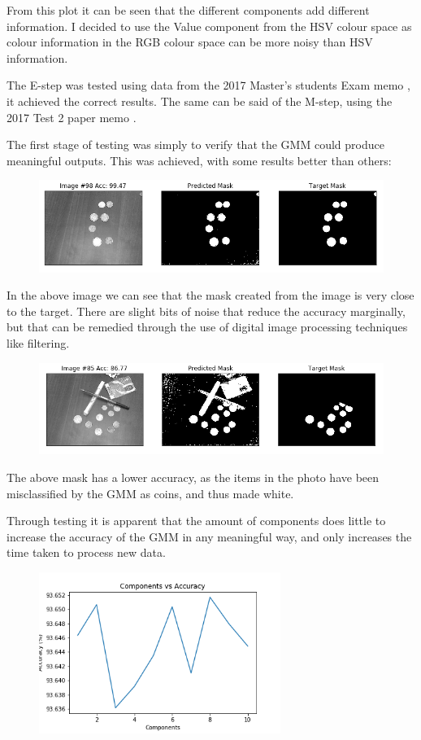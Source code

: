 \documentclass[10pt]{article}
\begin{document}
From this plot it can be seen that the different components add different information. I decided to use the Value component from the HSV colour space as colour information in the RGB colour space can be more noisy than HSV information. 

The E-step was tested using data from the 2017 Master's students Exam memo \cite{exam}, it achieved the correct results. The same can be said of the M-step, using the 2017 Test 2 paper memo \cite{test}.

The first stage of testing was simply to verify that the GMM could produce meaningful outputs. This was achieved, with some results better than others:
\begin{figure}[H]
    \includegraphics[width=\textwidth]{98}
    \centering
\end{figure}

In the above image we can see that the mask created from the image is very close to the target. There are slight bits of noise that reduce the accuracy marginally, but that can be remedied through the use of digital image processing techniques like filtering.

\begin{figure}[H]
    \includegraphics[width=\textwidth]{85}
    \centering
\end{figure}

The above mask has a lower accuracy, as the items in the photo have been misclassified by the GMM as coins, and thus made white.

Through testing it is apparent that the amount of components does little to increase the accuracy of the GMM in any meaningful way, and only increases the time taken to process new data. 

\begin{figure}[H]
    \includegraphics[width=0.7\textwidth]{acuracyc}
    \centering
\end{figure}
\end{document}
